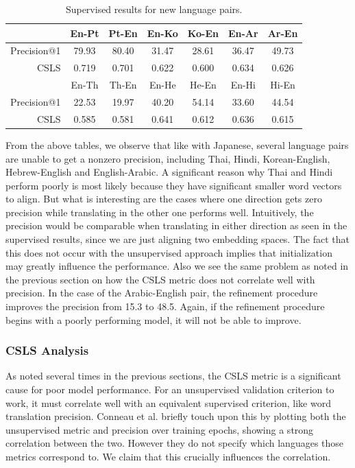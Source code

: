 \documentclass{article}
\begin{document}
\begin{table}[h]
  \centering
  \begin{tabular}{r|cc|cc|cc}
    \toprule
    & En-Pt & Pt-En & En-Ko & Ko-En & En-Ar & Ar-En \\
    \midrule
    Precision@1 & 79.93 & 80.40 & 31.47 & 28.61 & 36.47 & 49.73 \\
    CSLS        & 0.719 & 0.701 & 0.622 & 0.600 & 0.634 & 0.626 \\
    \midrule
    \midrule
    & En-Th & Th-En & En-He & He-En & En-Hi & Hi-En \\
    \midrule
    Precision@1 & 22.53 & 19.97 & 40.20 & 54.14 & 33.60 & 44.54 \\
    CSLS        & 0.585 & 0.581 & 0.641 & 0.612 & 0.636 & 0.615 \\
    \bottomrule
  \end{tabular}
  \caption{Supervised results for new language pairs.}
\end{table}

From the above tables, we observe that like with Japanese, several
language pairs are unable to get a nonzero precision, including Thai,
Hindi, Korean-English, Hebrew-English and English-Arabic.
A significant reason why Thai and Hindi perform poorly is most likely
because they have significant smaller word vectors to align. But what
is interesting are the cases where one direction gets zero precision
while translating in the other one performs well. Intuitively, the
precision would be comparable when translating in either direction as
seen in the supervised results, since we are just aligning two
embedding spaces. The fact that this does not occur with the
unsupervised approach implies that initialization may greatly influence
the performance. Also we see the same problem as noted in the previous
section on how the CSLS metric does not correlate well with precision.
In the case of the Arabic-English pair, the refinement procedure improves
the precision from 15.3 to 48.5. Again, if the refinement procedure
begins with a poorly performing model, it will not be able to improve.

\subsubsection*{CSLS Analysis}

As noted several times in the previous sections, the CSLS metric is a
significant cause for poor model performance. For an unsupervised
validation criterion to work, it must correlate well with an equivalent
supervised criterion, like word translation precision. Conneau et al.
briefly touch upon this by plotting both the unsupervised metric and
precision over training epochs, showing a strong correlation between the two.
However they do not specify which languages those metrics correspond to. We
claim that this crucially influences the correlation.
\end{document}
